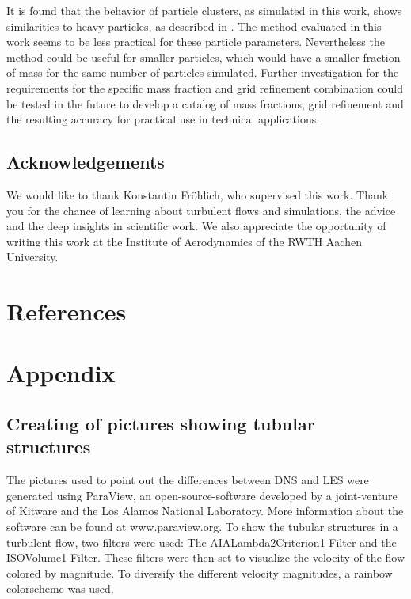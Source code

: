 \documentclass[11pt,a4paper,openany,oneside,parskip=half*]{article}
\begin{document}
It is found that the behavior of particle clusters, as simulated in this work, shows similarities to heavy particles, as described in \cite{Schneiders2017}.
\newline
The method evaluated in this work seems to be less practical for these particle parameters. Nevertheless the method could be useful for smaller particles, which would have a smaller fraction of mass for the same number of particles simulated. Further investigation for the requirements for the specific mass fraction and grid refinement combination could be tested in the future to develop a catalog of mass fractions, grid refinement and the resulting accuracy for practical use in technical applications. 
\newline
\subsection*{Acknowledgements}
We would like to thank Konstantin Fr\"ohlich, who supervised this work. Thank you for the chance of learning about turbulent flows and simulations, the advice and the deep insights in scientific work. We also appreciate the opportunity of writing this work at the Institute of Aerodynamics of the RWTH Aachen University.
\pagebreak
\section{References}
\vspace*{-1.2cm}
\nocite{*} %
\pagebreak
\section{Appendix}
\subsection*{Creating of pictures showing tubular structures}
The pictures used to point out the differences between DNS and LES were generated using ParaView, an open-source-software developed by a joint-venture of Kitware and the Los Alamos National Laboratory. More information about the software can be found at www.paraview.org. To show the tubular structures in a turbulent flow, two filters were used: The AIALambda2Criterion1-Filter and the ISOVolume1-Filter. These filters were then set to visualize the velocity of the flow colored by magnitude. To diversify the different velocity magnitudes, a rainbow colorscheme was used. 
\end{document}
